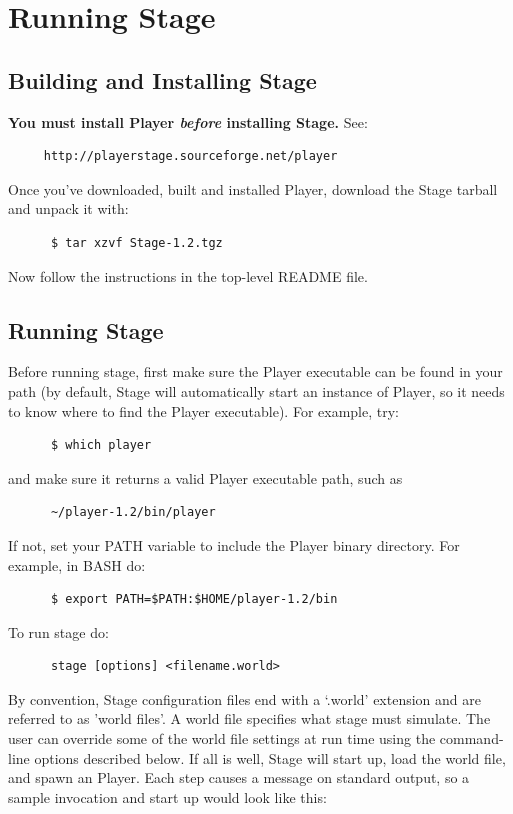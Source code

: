 \documentclass[11pt]{report}
\begin{document}
\chapter{Running Stage}
  \section{Building and Installing Stage}

    {\bf You must install Player {\sl before} installing Stage.} 
    See:
	\begin{verbatim}
	 http://playerstage.sourceforge.net/player
	\end{verbatim}

    \noindent Once you've downloaded, built and installed Player, download
    the Stage tarball and unpack it with:
      \begin{verbatim}
      $ tar xzvf Stage-1.2.tgz
      \end{verbatim}
    Now follow the instructions in the top-level README file.

  \section{Running Stage}

    Before running stage, first make sure the Player executable can be
    found in your path (by default, Stage will automatically start an instance of Player, so it needs to know where to find the Player executable).
    For example, try:
      \begin{verbatim}
      $ which player
      \end{verbatim}
    and make sure it returns a valid Player executable path, such as
      \begin{verbatim}
      ~/player-1.2/bin/player
      \end{verbatim}
    If not, set your PATH variable to include the Player binary directory. 
    For example, in BASH do:
      \begin{verbatim}  
      $ export PATH=$PATH:$HOME/player-1.2/bin
      \end{verbatim}  

    To run stage do: 
      \begin{verbatim} 
      stage [options] <filename.world> 
      \end{verbatim} 

    By convention, Stage configuration files end with a `.world'
    extension and are referred to as 'world files'. A world file
    specifies what stage must simulate. The user can override some of
    the world file settings at run time using the command-line options
    described below. If all is well, Stage will start up, load the
    world file, and spawn an Player. Each step causes a message on
    standard output, so a sample invocation and start up would look
    like this:
\end{document}

